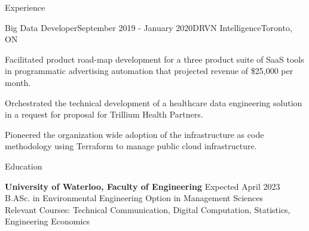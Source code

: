 \documentclass{resume} %
\begin{document}
\begin{rSection}{Experience}
\begin{rSubsection}{Big Data Developer}{September 2019 - January 2020}{DRVN Intelligence}{Toronto, ON}
\item Facilitated product road-map development for a three product suite of SaaS tools in programmatic advertising automation that projected revenue of \$25,000 per month.
\item Orchestrated the technical development of a healthcare data engineering solution in a request for proposal for Trillium Health Partners.
\item Pioneered the organization wide adoption of the infrastructure as code methodology using Terraform to manage public cloud infrastructure. 
\end{rSubsection}




\begin{rSection}{Education}

{\bf University of Waterloo, Faculty of Engineering} \hfill { Expected April 2023} \\ 
B.ASc. in Environmental Engineering Option in Management Sciences \\
Relevant Courses: Technical Communication, Digital Computation, Statistics, Engineering Economics

\end{rSection}



\end{rSection}
\end{document}
